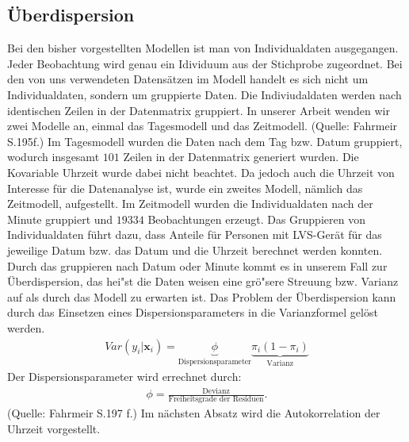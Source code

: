 \documentclass[12pt]{scrreprt}
\begin{document}
\subsection{Überdispersion}
Bei den bisher vorgestellten Modellen ist man von Individualdaten ausgegangen. Jeder Beobachtung wird genau ein Idividuum aus der Stichprobe zugeordnet.
Bei den von uns verwendeten Datensätzen im Modell handelt es sich nicht um Individualdaten, sondern um gruppierte Daten. Die Indiviudaldaten werden nach identischen Zeilen in der Datenmatrix gruppiert. In unserer Arbeit wenden wir zwei Modelle an, einmal das Tagesmodell und das Zeitmodell. (Quelle: Fahrmeir S.195f.) Im Tagesmodell wurden die Daten nach dem Tag bzw. Datum gruppiert, wodurch insgesamt $101$ Zeilen in der Datenmatrix generiert wurden. Die Kovariable Uhrzeit wurde dabei nicht beachtet. Da jedoch auch die Uhrzeit von Interesse für die Datenanalyse ist, wurde ein zweites Modell, nämlich das Zeitmodell, aufgestellt. Im Zeitmodell wurden die Individualdaten nach der Minute gruppiert und $19334$ Beobachtungen erzeugt. Das Gruppieren von Individualdaten führt dazu, dass Anteile für Personen mit LVS-Gerät für das jeweilige Datum bzw. das Datum und die Uhrzeit berechnet werden konnten. Durch das gruppieren nach Datum oder Minute kommt es in unserem Fall zur Überdispersion, das hei"st die Daten weisen eine grö"sere Streuung bzw. Varianz auf als durch das Modell zu erwarten ist. Das Problem der Überdispersion kann durch das Einsetzen eines Dispersionsparameters in die Varianzformel gelöst werden.
\begin{align}
Var(y_{i}|\textbf{x}_{i})=\underbrace{\phi}_\text{Dispersionsparameter} \underbrace{\pi_{i}(1-\pi_{i})}_\text{Varianz}
\end{align}
Der Dispersionsparameter wird errechnet durch:
\begin{align}
\phi=\frac{\text{Devianz}}{\text{Freiheitsgrade der Residuen}}.
\end{align} 
(Quelle: Fahrmeir S.197 f.)
Im nächsten Absatz wird die Autokorrelation der Uhrzeit vorgestellt.
\end{document}
